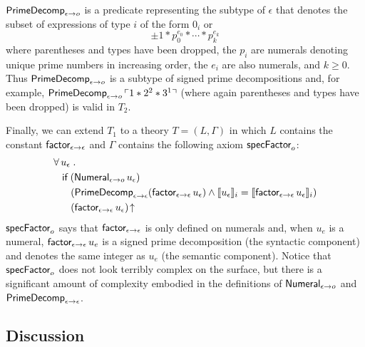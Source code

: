 \documentclass[fleqn]{llncs}
\begin{document}
  \item $\mbox{\sf PrimeDecomp}_{\epsilon \rightarrow o}$ is a predicate
    representing the subtype of $\epsilon$ that denotes the subset of
    expressions of type $i$ of the form $0_i$ or \[\pm 1 * p_{0}^{e_0}
    * \cdots * p_{k}^{e_k}\] where parentheses and types have been
    dropped, the $p_i$ are numerals denoting unique prime numbers in
    increasing order, the $e_i$ are also numerals, and $k \ge 0$.
    Thus $\mbox{\sf PrimeDecomp}_{\epsilon \rightarrow o}$ is a subtype of
    signed prime decompositions and, for example,
    $\mbox{\sf PrimeDecomp}_{\epsilon \rightarrow o}\, \ulcorner1 * 2^2 *
      3^1\urcorner$ (where again parentheses and types have been dropped) is
    valid in $T_2$.

\ee

Finally, we can extend $T_1$ to a theory $T = (L,\Gamma)$ in which $L$
contains the constant $\mbox{\sf factor}_{\epsilon \rightarrow \epsilon}$ and
$\Gamma$ contains the following axiom $\mbox{\sf specFactor}_o$:
\begin{align*}\setcounter{equation}{0}
&
\ForallApp u_\epsilon \mdot\\
& \hspace*{2ex}
\If \; (\mname{Numeral}_{\epsilon \tarrow o} \, u_\epsilon)\\
& \hspace*{4ex}
(\mname{PrimeDecomp}_{\epsilon \tarrow \epsilon}(\mname{factor}_{\epsilon \tarrow \epsilon} \, u_\epsilon) \And 
\sembrack{u_\epsilon}_i = \sembrack{\mname{factor}_{\epsilon \tarrow \epsilon} \, u_\epsilon}_i)
\\
& \hspace*{4ex}
(\mname{factor}_{\epsilon \tarrow \epsilon} \, u_\epsilon)\IsUndefApp
\end{align*}
$\mbox{\sf specFactor}_o$ says that $\mbox{\sf factor}_{\epsilon \rightarrow
  \epsilon}$ is only defined on numerals and, when $u_e$ is a numeral,
$\mbox{\sf factor}_{\epsilon \rightarrow \epsilon} \, u_e$ is a signed prime
decomposition (the syntactic component) and denotes the same integer
as $u_e$ (the semantic component).  Notice that $\mbox{\sf specFactor}_o$
does not look terribly complex on the surface, but there is a
significant amount of complexity embodied in the definitions of
$\mbox{\sf Numeral}_{\epsilon \rightarrow o}$ and
$\mbox{\sf PrimeDecomp}_{\epsilon \rightarrow \epsilon}$.

\subsection{Discussion}
\end{document}
